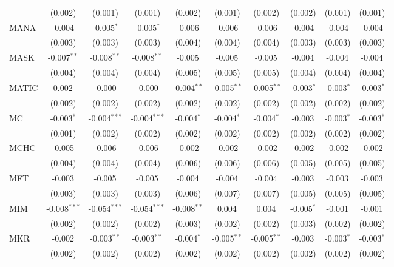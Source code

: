 \begin{table}[!htbp]
\begin{tabular}{@{\extracolsep{5pt}}lccccccccc}
  & (0.002) & (0.001) & (0.001) & (0.002) & (0.001) & (0.002) & (0.002) & (0.001) & (0.001) \\
 MANA & -0.004$^{}$ & -0.005$^{*}$ & -0.005$^{*}$ & -0.006$^{}$ & -0.006$^{}$ & -0.006$^{}$ & -0.004$^{}$ & -0.004$^{}$ & -0.004$^{}$ \\
  & (0.003) & (0.003) & (0.003) & (0.004) & (0.004) & (0.004) & (0.003) & (0.003) & (0.003) \\
 MASK & -0.007$^{**}$ & -0.008$^{**}$ & -0.008$^{**}$ & -0.005$^{}$ & -0.005$^{}$ & -0.005$^{}$ & -0.004$^{}$ & -0.004$^{}$ & -0.004$^{}$ \\
  & (0.004) & (0.004) & (0.004) & (0.005) & (0.005) & (0.005) & (0.004) & (0.004) & (0.004) \\
 MATIC & 0.002$^{}$ & -0.000$^{}$ & -0.000$^{}$ & -0.004$^{**}$ & -0.005$^{**}$ & -0.005$^{**}$ & -0.003$^{*}$ & -0.003$^{*}$ & -0.003$^{*}$ \\
  & (0.002) & (0.002) & (0.002) & (0.002) & (0.002) & (0.002) & (0.002) & (0.002) & (0.002) \\
 MC & -0.003$^{*}$ & -0.004$^{***}$ & -0.004$^{***}$ & -0.004$^{*}$ & -0.004$^{*}$ & -0.004$^{*}$ & -0.003$^{}$ & -0.003$^{*}$ & -0.003$^{*}$ \\
  & (0.001) & (0.002) & (0.002) & (0.002) & (0.002) & (0.002) & (0.002) & (0.002) & (0.002) \\
 MCHC & -0.005$^{}$ & -0.006$^{}$ & -0.006$^{}$ & -0.002$^{}$ & -0.002$^{}$ & -0.002$^{}$ & -0.002$^{}$ & -0.002$^{}$ & -0.002$^{}$ \\
  & (0.004) & (0.004) & (0.004) & (0.006) & (0.006) & (0.006) & (0.005) & (0.005) & (0.005) \\
 MFT & -0.003$^{}$ & -0.005$^{}$ & -0.005$^{}$ & -0.004$^{}$ & -0.004$^{}$ & -0.004$^{}$ & -0.003$^{}$ & -0.003$^{}$ & -0.003$^{}$ \\
  & (0.003) & (0.003) & (0.003) & (0.006) & (0.007) & (0.007) & (0.005) & (0.005) & (0.005) \\
 MIM & -0.008$^{***}$ & -0.054$^{***}$ & -0.054$^{***}$ & -0.008$^{**}$ & 0.004$^{}$ & 0.004$^{}$ & -0.005$^{*}$ & -0.001$^{}$ & -0.001$^{}$ \\
  & (0.002) & (0.002) & (0.002) & (0.003) & (0.002) & (0.002) & (0.003) & (0.002) & (0.002) \\
 MKR & -0.002$^{}$ & -0.003$^{**}$ & -0.003$^{**}$ & -0.004$^{*}$ & -0.005$^{**}$ & -0.005$^{**}$ & -0.003$^{}$ & -0.003$^{*}$ & -0.003$^{*}$ \\
  & (0.002) & (0.002) & (0.002) & (0.002) & (0.002) & (0.002) & (0.002) & (0.002) & (0.002) \\

\end{tabular}
\end{table}
